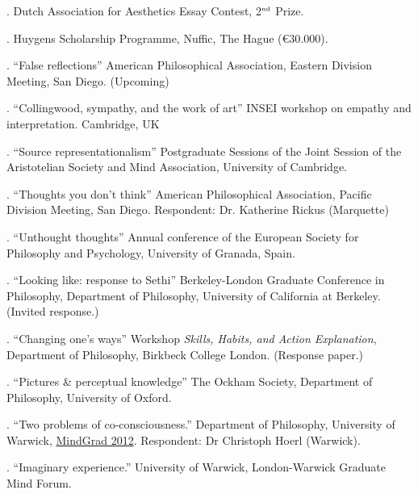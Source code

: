 \documentclass[12pt]{article}
\begin{document}
. Dutch Association for Aesthetics Essay Contest, 2$^{\textrm{\tiny{nd}}}$ Prize.

. Huygens Scholarship Programme, Nuffic, The Hague (€30.000).

\bigskip 



\medskip

. ``False reflections'' American Philosophical Association, Eastern Division Meeting, San Diego. (Upcoming)

. ``Collingwood, sympathy, and the work of art'' INSEI workshop on empathy and interpretation. Cambridge, UK

. ``Source representationalism'' Postgraduate Sessions of the Joint Session of the Aristotelian Society and Mind Association, University of Cambridge.

. ``Thoughts you don't think'' American Philosophical Association, Pacific Division Meeting, San Diego. Respondent: Dr. Katherine Rickus (Marquette) 


. ``Unthought thoughts'' Annual conference of the European Society for Philosophy and Psychology, University of Granada, Spain.

. ``Looking like: response to Sethi'' Berkeley-London Graduate Conference in Philosophy, Department of Philosophy, University of California at Berkeley. (Invited response.)

. ``Changing one's ways'' Workshop \emph{Skills, Habits, and Action Explanation}, Department of Philosophy, Birkbeck College London. (Response paper.)

. ``Pictures \& perceptual knowledge'' The Ockham Society, Department of Philosophy, University of Oxford.

. ``Two problems of co-consciousness.'' Department of Philosophy, University of Warwick, \href{http://www2.warwick.ac.uk/fac/soc/philosophy/news/conferences/mindgrad-2012/}{MindGrad 2012}. Respondent: Dr Christoph Hoerl (Warwick).

. ``Imaginary experience.'' University of Warwick, London-Warwick Graduate Mind Forum.
\end{document}
